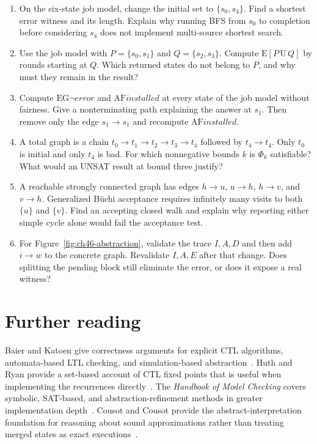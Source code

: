 \begin{enumerate}
\item\label{ex:ch46-multiple-initial}
On the six-state job model, change the initial set to $\{s_0,s_4\}$.
Find a shortest error witness and its length.
Explain why running BFS from $s_0$ to completion before considering $s_4$ does not implement multi-source shortest search.

\item\label{ex:ch46-until-zero}
Use the job model with $P=\{s_0,s_1\}$ and $Q=\{s_2,s_3\}$.
Compute $\mathrm{E}[P\,\mathrm{U}\,Q]$ by rounds starting at $Q$.
Which returned states do not belong to $P$, and why must they remain in the result?

\item\label{ex:ch46-eg-pruning}
Compute $\mathrm{EG}\neg\mathit{error}$ and $\mathrm{AF}\mathit{installed}$ at every state of the job model without fairness.
Give a nonterminating path explaining the answer at $s_1$.
Then remove only the edge $s_1\to s_1$ and recompute $\mathrm{AF}\mathit{installed}$.

\item\label{ex:ch46-bounded-unsat}
A total graph is a chain $t_0\to t_1\to t_2\to t_3\to t_4$ followed by $t_4\to t_4$.
Only $t_0$ is initial and only $t_4$ is bad.
For which nonnegative bounds $k$ is $\Phi_k$ satisfiable?
What would an UNSAT result at bound three justify?

\item\label{ex:ch46-accepting-walk}
A reachable strongly connected graph has edges $h\to u$, $u\to h$, $h\to v$, and $v\to h$.
Generalized B\"uchi acceptance requires infinitely many visits to both $\{u\}$ and $\{v\}$.
Find an accepting closed walk and explain why reporting either simple cycle alone would fail the acceptance test.

\item\label{ex:ch46-refinement}
For Figure~\ref{fig:ch46-abstraction}, validate the trace $I,A,D$ and then add $i\to w$ to the concrete graph.
Revalidate $I,A,E$ after that change.
Does splitting the pending block still eliminate the error, or does it expose a real witness?
\end{enumerate}

\section{Further reading}
\label{sec:ch46-reading}

Baier and Katoen give correctness arguments for explicit CTL algorithms, automata-based LTL checking, and simulation-based abstraction~\cite{baier-2008-model-checking}.
Huth and Ryan provide a set-based account of CTL fixed points that is useful when implementing the recurrences directly~\cite{huth-2004-logic}.
The \emph{Handbook of Model Checking} covers symbolic, SAT-based, and abstraction-refinement methods in greater implementation depth~\cite{clarke-2018-handbook}.
Cousot and Cousot provide the abstract-interpretation foundation for reasoning about sound approximations rather than treating merged states as exact executions~\cite{cousot-1977-abstract}.
